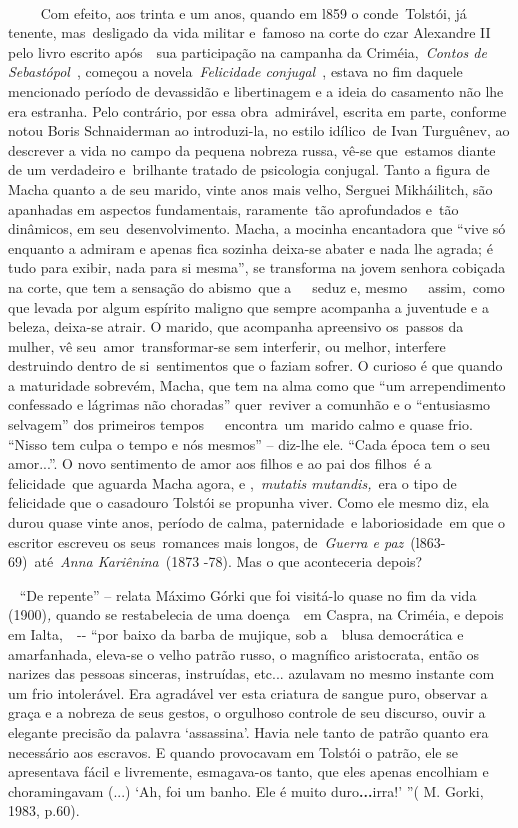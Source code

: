 ~

~~~~ Com efeito, aos trinta e um anos, quando em l859 o conde~Tolstói,
já tenente, mas~desligado da vida militar e~famoso na corte do czar
Alexandre II pelo livro escrito após~~sua participação na campanha da
Criméia,~\emph{Contos de Sebastópol}~, começou a novela~\emph{Felicidade
conjugal~}, estava no fim daquele mencionado período de devassidão e
libertinagem e a ideia do casamento não lhe era estranha. Pelo
contrário, por essa obra~admirável, escrita em parte, conforme notou
Boris Schnaiderman ao introduzi-la, no estilo idílico~de Ivan Turguênev,
ao descrever a vida no campo da pequena nobreza russa, vê-se que~estamos
diante de um verdadeiro e~brilhante tratado de psicologia conjugal.
Tanto a figura de Macha quanto a de seu marido, vinte anos mais velho,
Serguei Mikháilitch, são apanhadas em aspectos fundamentais,
raramente~tão aprofundados e~tão dinâmicos, em seu~desenvolvimento.
Macha, a mocinha encantadora que ``vive só enquanto a admiram e apenas
fica sozinha deixa-se abater e nada lhe agrada; é tudo para exibir, nada
para si mesma'', se transforma na jovem senhora cobiçada na corte, que
tem a sensação do abismo~que a~~~seduz e, mesmo~~~assim,~como que levada
por algum espírito maligno que sempre acompanha a juventude e a beleza,
deixa-se atrair. O marido, que acompanha apreensivo os~passos da mulher,
vê seu~amor~transformar-se sem interferir, ou melhor, interfere
destruindo dentro de si~sentimentos que o faziam sofrer. O curioso é que
quando a maturidade sobrevém, Macha, que tem na alma como que ``um
arrependimento confessado e lágrimas não choradas'' quer~reviver a
comunhão e o ``entusiasmo selvagem'' dos primeiros
tempos~~~encontra~um~marido calmo e quase frio. ``Nisso tem culpa o
tempo e nós mesmos'' -- diz-lhe ele. ``Cada época tem o seu amor...''. O
novo sentimento de amor aos filhos e ao pai dos filhos~é a
felicidade~que aguarda Macha agora, e ,~\emph{mutatis mutandis,}~era o
tipo de felicidade que o casadouro Tolstói se propunha viver. Como ele
mesmo diz, ela durou quase vinte anos, período de calma, paternidade~e
laboriosidade~em que o escritor escreveu os seus~romances mais longos,
de~\emph{Guerra e paz}~(l863-69)~até~\emph{Anna Kariênina}~(1873 -78).
Mas o que aconteceria depois?

~ ``De repente'' -- relata Máximo Górki que foi visitá-lo quase no fim
da vida (1900)\emph{,} quando se restabelecia de uma doença~~em Caspra,
na Criméia, e depois em Ialta,~\emph{~}-\/- ``por baixo da barba de
mujique, sob a~~blusa democrática e amarfanhada, eleva-se o velho patrão
russo, o magnífico aristocrata, então os narizes das pessoas sinceras,
instruídas, etc... azulavam no mesmo instante com um frio intolerável.
Era agradável ver esta criatura de sangue puro, observar a graça e a
nobreza de seus gestos, o orgulhoso controle de seu discurso, ouvir a
elegante precisão da palavra `assassina'. Havia nele tanto de patrão
quanto era necessário aos escravos. E quando provocavam em Tolstói o
patrão, ele se apresentava fácil e livremente, esmagava-os tanto, que
eles apenas encolhiam e choramingavam (...) `Ah, foi um banho. Ele é
muito duro\textbf{...}irra!' ''( M. Gorki, 1983, p.60).

